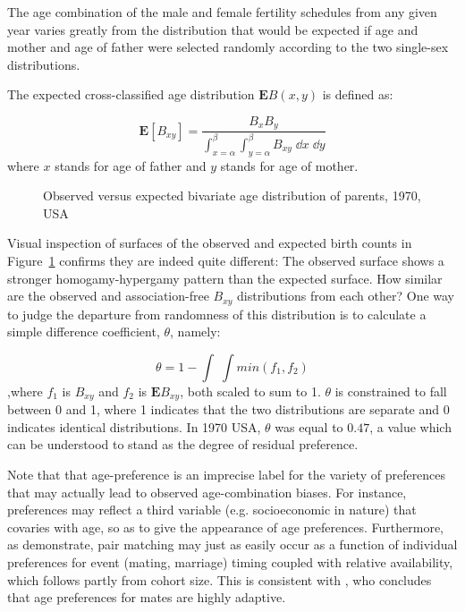  \FloatBarrier
The age combination of the male and female fertility schedules from
any given year varies greatly from the distribution that would be expected if
age and mother and age of father were selected randomly according to the two
single-sex distributions.

The expected cross-classified age distribution $\textbf{E}B(x,y)$ is defined as:

\begin{equation}
\label{eq:expected}
\textbf{E}\left[B_{xy}\right] = \frac{B_x B_y}{\int _{x = \alpha} ^\beta \int
_{y = \alpha} ^\beta B_{xy} \; \dd x \;\dd y}
\end{equation}
where $x$ stands for age of father and $y$ stands for age of mother.

\begin{figure}[ht!]
        \centering  
          \caption{Observed versus expected bivariate age distribution of
          parents, 1970, USA}
          \label{fig:US1970obsexp}
\end{figure}


Visual inspection of surfaces of the observed and expected birth counts in
Figure~\ref{fig:US1970obsexp} confirms they are indeed quite different: The
observed surface shows a stronger homogamy-hypergamy pattern than the expected surface. How similar are the
observed and association-free $B_{xy}$ distributions from each other? One way to
judge the departure from randomness of this distribution is to calculate a
simple difference coefficient, $\theta$, namely:

\begin{equation}
\label{eq:coefdiff}
\theta = 1 - \int \;\int min(f_1, f_2)
\end{equation}
,where $f_1$ is $B_{xy}$ and $f_2$ is $\textbf{E}B_{xy}$, both scaled to sum to
1. $\theta$ is constrained to fall between 0 and 1, where 1 indicates that the
two distributions are separate and 0 indicates identical distributions. In 1970 USA,
$\theta$ was equal to $0.47$, a value which can be understood to stand as the
degree of residual preference.

Note that that age-preference is an imprecise label for the variety
of preferences that may actually lead to observed age-combination biases. For
instance, preferences may reflect a third variable (e.g. socioeconomic
in nature) that covaries with age, so as to give the appearance of age
preferences. Furthermore, as \citet{bergstrom1994sweden}
demonstrate, pair matching may just as easily occur as a function of individual
preferences for event (mating, marriage) timing coupled with relative
availability, which follows partly from cohort size. This is consistent with
\citet{bhrolchain2001flexibility}, who concludes that age preferences for
mates are highly adaptive.

